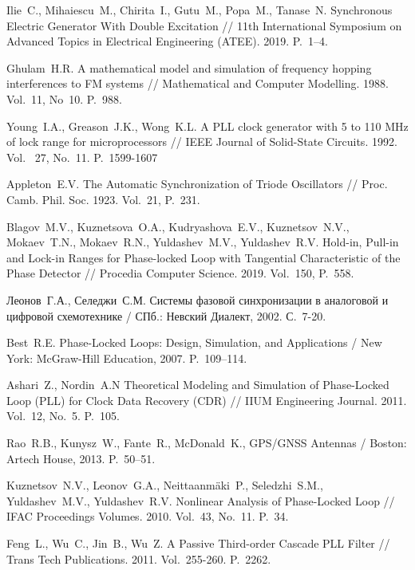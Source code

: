 \documentclass[a4paper,article,14pt]{extarticle}
\begin{document}
\pagebreak
\begin{thebibliography}{20}
 Ilie~C., Mihaiescu~M., Chirita~I., Gutu~M., Popa~M., Tanase~N. Synchronous Electric Generator With Double Excitation // 11th International Symposium on Advanced Topics in Electrical Engineering (ATEE). 2019. P.~1--4.

 Ghulam~H.\:R. A mathematical model and simulation of frequency hopping interferences to FM systems // Mathematical and Computer Modelling. 1988. Vol.~11, No~10. P.~988.

Young~I.\:A., Greason~J.\:K., Wong~K.\:L. A PLL clock generator with 5 to 110 MHz of lock range for microprocessors //  IEEE Journal of Solid-State Circuits. 1992. Vol.~ 27, No.~11. P.~1599-1607

 Appleton~E.\:V. The Automatic Synchronization of Triode Oscillators // Proc. Camb. Phil. Soc. 1923. Vol.~21, P.~231.

 Blagov~M.\:V., Kuznetsova~O.\:A., Kudryashova~E.\:V., Kuznetsov~N.\:V., Mokaev~T.\:N., Mokaev~R.\:N., Yuldashev~M.\:V., Yuldashev~R.\:V. Hold-in, Pull-in and Lock-in Ranges for Phase-locked Loop with Tangential Characteristic of the Phase Detector // Procedia Computer Science. 2019.
Vol.~150, P.~558.

Леонов~Г.\:А., Селеджи~С.\:М. Системы фазовой синхронизации в аналоговой и цифровой схемотехнике / СПб.: Невский Диалект, 2002. С.~7-20.

  Best~R.\:E. Phase-Locked Loops: Design, Simulation, and Applications / New York: McGraw-Hill Education, 2007. P.~109--114.

Ashari~Z., Nordin~A.\:N Theoretical Modeling and Simulation of Phase-Locked Loop (PLL) for Clock Data Recovery (CDR) // IIUM Engineering Journal. 2011. Vol.~12, No.~5. P.~105.

  Rao~R.\:B., Kunysz~W., Fante~R., McDonald~K., GPS/GNSS Antennas / Boston: Artech House, 2013. P.~50--51.

Kuznetsov~N.\:V., Leonov~G.\:A., Neittaanmäki~P., Seledzhi~S.\:M., Yuldashev~M.\:V., Yuldashev~R.\:V. Nonlinear Analysis of Phase-Locked Loop // IFAC Proceedings Volumes. 2010. Vol.~43, No.~11. P.~34.

 Feng~L., Wu~C., Jin~B., Wu~Z. A Passive Third-order Cascade PLL Filter // Trans Tech Publications. 2011. Vol.~255-260. P.~2262.


\end{thebibliography}
\end{document}
